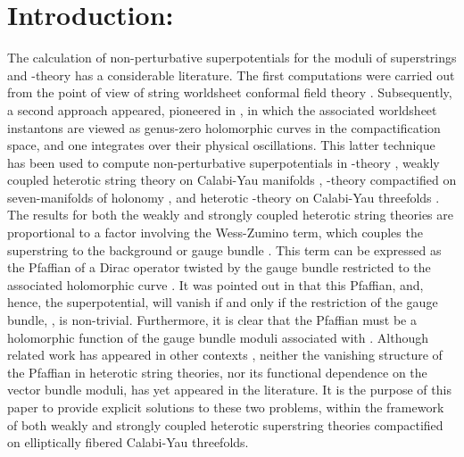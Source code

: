\documentclass[a4paper,12pt]{article}
\numberwithin{equation}{section}
\theoremstyle{plain}
\begin{document}

\section{Introduction:}

The calculation of non-perturbative superpotentials for the moduli of
superstrings and \coordHE{}-theory has a considerable literature. The first
computations
were
carried out from the point of view of string worldsheet conformal field
theory \cite{DSWW1,DSWW2}.
Subsequently, a second approach appeared, pioneered in \cite{Witten1,
BBS},
in which
the associated worldsheet instantons are viewed as genus-zero holomorphic
curves \coordHE{} in the compactification space, and one integrates over their
physical oscillations. This latter technique has been used to compute
non-perturbative superpotentials in \coordHE{}-theory \cite{DGW},
weakly coupled heterotic string theory on
Calabi-Yau manifolds \cite{Witten2}, \coordHE{}-theory compactified on
seven-manifolds of \coordHE{}
holonomy \cite{HM},
and heterotic \coordHE{}-theory on
Calabi-Yau threefolds
\cite{Lima1,Lima2}.
The results for
both the weakly and strongly coupled heterotic string theories are
proportional to a factor involving the Wess-Zumino term, which couples the
superstring to the background \coordHE{} or \coordHE{}
gauge bundle \coordHE{}
\cite{Witten2,Lima1,Lima2}.
This term can be expressed as the Pfaffian of a Dirac operator twisted by
the gauge bundle restricted to the associated holomorphic curve \coordHE{}.
It was pointed out in \cite{Witten2} that this Pfaffian, and, hence,
the superpotential,
will vanish if and only if the restriction of the gauge bundle,
\coordHE{}, is non-trivial. Furthermore, it is clear that the Pfaffian
must be a holomorphic function of the gauge bundle moduli associated with
\coordHE{}. Although related work has appeared in other contexts \cite{DGW},
neither the vanishing structure of the Pfaffian in heterotic string
theories,
nor its functional dependence on the vector bundle moduli, has yet
appeared in
the literature. It is the purpose of this paper to provide explicit
solutions
to these two problems, within the framework of both weakly and strongly
coupled
heterotic \coordHE{} superstring theories compactified on
elliptically fibered Calabi-Yau threefolds.
\end{document}
